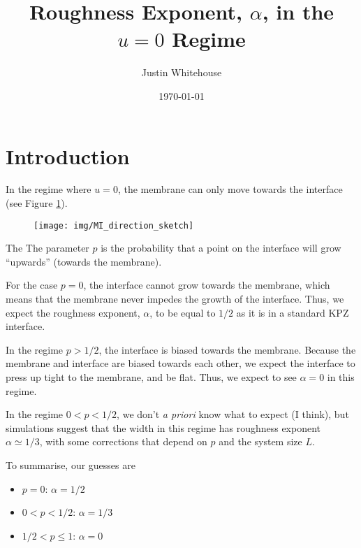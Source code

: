 \documentclass[a4paper,10pt]{article}
\title{Roughness Exponent, $\alpha$, in the $u=0$ Regime}
\author{Justin Whitehouse}
\date{\today}
\newcommand{\fref}[1]{Figure \ref{#1}}
\begin{document}
\maketitle


\tableofcontents
\newpage


\section{Introduction}

In the regime where $u = 0$, the membrane can only move towards the interface (see \fref{fig:MI_direction_sketch}).
\begin{figure}[h!]
 \centering
 \texttt{[image: img/MI\_direction\_sketch]}
 \label{fig:MI_direction_sketch}
\end{figure}
The The parameter $p$ is the probability that a point on the interface will grow ``upwards'' (towards the membrane). 

For the case $p=0$, the interface cannot grow towards the membrane, which means that the membrane never impedes the growth of the interface. Thus, we expect the roughness exponent, $\alpha$, to be equal to $1/2$ as it is in a standard KPZ interface. 

In the regime $p > 1/2$, the interface is biased towards the membrane. Because the membrane and interface are biased towards each other, we expect the interface to press up tight to the membrane, and be flat. Thus, we expect to see $\alpha = 0$ in this regime. 

In the regime $0 < p < 1/2$, we don't \emph{a priori} know what to expect (I think), but simulations suggest that the width in this regime has roughness exponent $\alpha \simeq 1/3$, with some corrections that depend on $p$ and the system size $L$.

To summarise, our guesses are
\begin{itemize}
 \item $p =0$: $\alpha = 1/2$
 \item $0 < p < 1/2$: $\alpha = 1/3$
 \item $1/2 < p \le 1$: $\alpha = 0$
\end{itemize}
\end{document}
